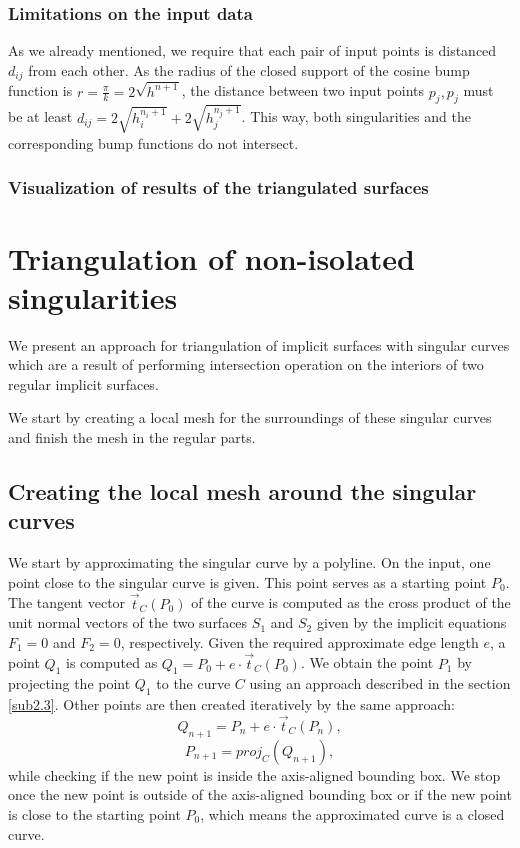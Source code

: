\subsubsection*{Limitations on the input data}
As we already mentioned, we require that each pair of input points is
distanced $d_{ij}$ from each other. As the radius of the closed support
of the cosine bump function is $r=\frac{\pi}{k}=2\sqrt{h^{n+1}}$, the 
distance between two input points $p_j, p_j$ must be at least
$d_{ij} = 2\sqrt{h_i^{n_i+1}}+2\sqrt{h_j^{n_j+1}}$. This way, both singularities
and the corresponding bump functions do not intersect. 

\subsubsection*{Visualization of results of the triangulated surfaces}

\section{Triangulation of non-isolated singularities}
\label{sub3.3}

We present an approach for triangulation of implicit surfaces with singular
curves which are
a result of performing intersection operation on the interiors of two
regular implicit surfaces.

We start by creating a local mesh for the surroundings of these singular
curves and finish the mesh in the regular parts.

\subsection{Creating the local mesh around the singular curves}

We start by approximating the singular curve by a polyline.
On the input, one point close to the singular curve is given. This point serves as
a starting point $P_0$. The tangent vector $\vec{t}_C(P_0)$ of the curve is computed as
the cross product of the unit normal vectors of the two surfaces $S_1$ and $S_2$ given
by the implicit equations $F_1=0$ and $F_2=0$, respectively.
Given the required approximate edge length $e$, a point $Q_1$ is computed as
$Q_1 = P_0 + e \cdot \vec{t}_C(P_0)$. We obtain the point $P_1$ by projecting the point 
$Q_1$ to the curve $C$ using an approach described in the section \ref{sub2.3}.
Other points are then created iteratively by the same approach:
$$Q_{n+1} = P_n + e \cdot \vec{t}_C(P_n),$$
$$P_{n+1} = proj_C(Q_{n+1}),$$
while checking if the new point is inside the axis-aligned bounding box.
We stop once the new point is outside of the axis-aligned bounding box or
if the new point is close to the starting point $P_0$, which means the approximated
curve is a closed curve.

